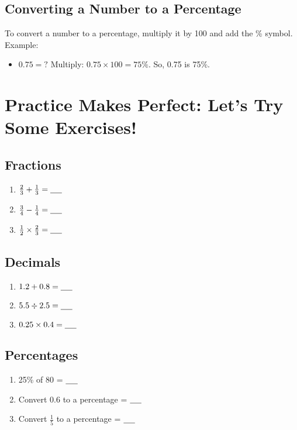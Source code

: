 \subsection{Converting a Number to a Percentage}
To convert a number to a percentage, multiply it by 100 and add the \% symbol. Example:
\begin{itemize}
    \item $0.75 = ?$ Multiply: $0.75 \times 100 = 75\%$. So, 0.75 is 75\%.
\end{itemize}

\section{Practice Makes Perfect: Let’s Try Some Exercises!}
\subsection{Fractions}
\begin{enumerate}
    \item $\frac{2}{3} + \frac{1}{3} = \underline{\hspace{0.5cm}}$
    \item $\frac{3}{4} - \frac{1}{4} = \underline{\hspace{0.5cm}}$
    \item $\frac{1}{2} \times \frac{2}{3} = \underline{\hspace{0.5cm}}$
\end{enumerate}

\subsection{Decimals}
\begin{enumerate}
    \item $1.2 + 0.8 = \underline{\hspace{0.5cm}}$
    \item $5.5 \div 2.5 = \underline{\hspace{0.5cm}}$
    \item $0.25 \times 0.4 = \underline{\hspace{0.5cm}}$
\end{enumerate}

\subsection{Percentages}
\begin{enumerate}
    \item 25\% of 80 = $\underline{\hspace{0.5cm}}$
    \item Convert 0.6 to a percentage = $\underline{\hspace{0.5cm}}$
    \item Convert $\frac{1}{5}$ to a percentage = $\underline{\hspace{0.5cm}}$
\end{enumerate}

